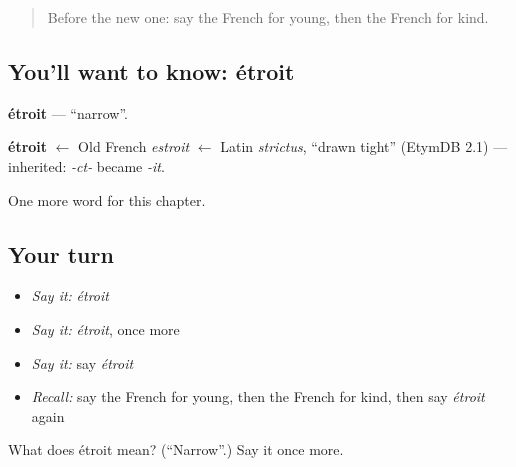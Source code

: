 \begin{quote}
Before the new one: say the French for young, then the French for kind.
\end{quote}

\subsection*{You'll want to know: étroit}
\textbf{étroit} — \textquotedblleft{}narrow\textquotedblright{}.

\begin{cousinweb}
\textbf{étroit} $\leftarrow$ Old French \emph{estroit} $\leftarrow$ Latin \emph{strictus}, \textquotedblleft{}drawn tight\textquotedblright{} (EtymDB 2.1) — inherited: \emph{-ct-} became \emph{-it}.
\end{cousinweb}

\begin{grammarlens}[title={What you've built}]
One more word for this chapter.
\end{grammarlens}

\subsection*{Your turn}
\begin{itemize}
\raggedright
  \item \emph{Say it:} \emph{étroit}
  \item \emph{Say it:} \emph{étroit}, once more
  \item \emph{Say it:} say \emph{étroit}
  \item \emph{Recall:} say the French for young, then the French for kind, then say \emph{étroit} again
\end{itemize}

\begin{tcolorbox}[breakable,colback=teal!4,colframe=teal!35!black,title={Before you move on}]
What does étroit mean? (\textquotedblleft{}Narrow\textquotedblright{}.) Say it once more.
\end{tcolorbox}
